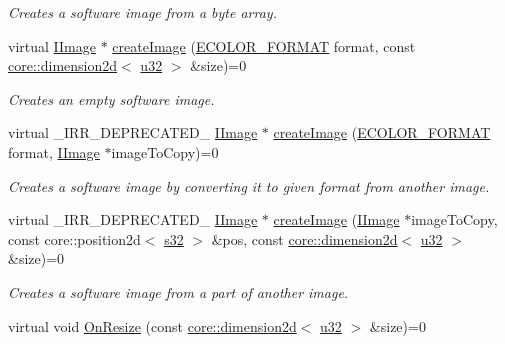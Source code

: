 \begin{DoxyCompactItemize}
\begin{DoxyCompactList}\small\item\em Creates a software image from a byte array. \end{DoxyCompactList}\item 
virtual \hyperlink{classirr_1_1video_1_1IImage}{I\+Image} $\ast$ \hyperlink{classirr_1_1video_1_1IVideoDriver_aee1578fdd92118665755f31c0dd1dbb5}{create\+Image} (\hyperlink{namespaceirr_1_1video_a1d5e487888c32b1674a8f75116d829ed}{E\+C\+O\+L\+O\+R\+\_\+\+F\+O\+R\+M\+AT} format, const \hyperlink{classirr_1_1core_1_1dimension2d}{core\+::dimension2d}$<$ \hyperlink{namespaceirr_a0416a53257075833e7002efd0a18e804}{u32} $>$ \&size)=0
\begin{DoxyCompactList}\small\item\em Creates an empty software image. \end{DoxyCompactList}\item 
virtual \+\_\+\+I\+R\+R\+\_\+\+D\+E\+P\+R\+E\+C\+A\+T\+E\+D\+\_\+ \hyperlink{classirr_1_1video_1_1IImage}{I\+Image} $\ast$ \hyperlink{classirr_1_1video_1_1IVideoDriver_af92ef735bc8c755f5c201a52a70d05e8}{create\+Image} (\hyperlink{namespaceirr_1_1video_a1d5e487888c32b1674a8f75116d829ed}{E\+C\+O\+L\+O\+R\+\_\+\+F\+O\+R\+M\+AT} format, \hyperlink{classirr_1_1video_1_1IImage}{I\+Image} $\ast$image\+To\+Copy)=0
\begin{DoxyCompactList}\small\item\em Creates a software image by converting it to given format from another image. \end{DoxyCompactList}\item 
virtual \+\_\+\+I\+R\+R\+\_\+\+D\+E\+P\+R\+E\+C\+A\+T\+E\+D\+\_\+ \hyperlink{classirr_1_1video_1_1IImage}{I\+Image} $\ast$ \hyperlink{classirr_1_1video_1_1IVideoDriver_aa06059abf33e473d7af77e1fbc2b0f75}{create\+Image} (\hyperlink{classirr_1_1video_1_1IImage}{I\+Image} $\ast$image\+To\+Copy, const core\+::position2d$<$ \hyperlink{namespaceirr_ac66849b7a6ed16e30ebede579f9b47c6}{s32} $>$ \&pos, const \hyperlink{classirr_1_1core_1_1dimension2d}{core\+::dimension2d}$<$ \hyperlink{namespaceirr_a0416a53257075833e7002efd0a18e804}{u32} $>$ \&size)=0
\begin{DoxyCompactList}\small\item\em Creates a software image from a part of another image. \end{DoxyCompactList}\item 
virtual void \hyperlink{classirr_1_1video_1_1IVideoDriver_a1a236e1233fc6fc2c5f36aaa830814fc}{On\+Resize} (const \hyperlink{classirr_1_1core_1_1dimension2d}{core\+::dimension2d}$<$ \hyperlink{namespaceirr_a0416a53257075833e7002efd0a18e804}{u32} $>$ \&size)=0

\end{DoxyCompactItemize}
